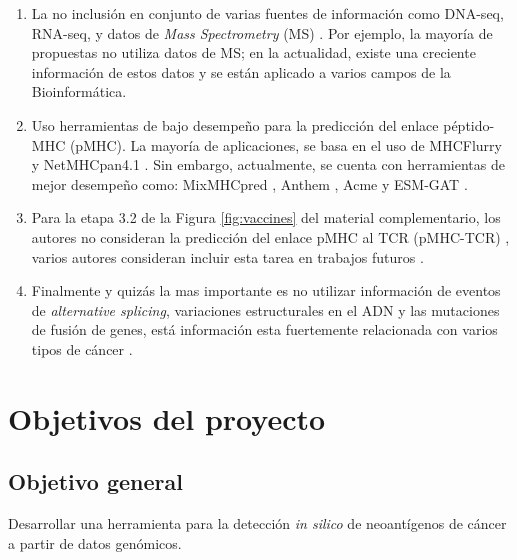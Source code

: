\documentclass[a4paper,11pt]{article}
\begin{document}
\begin{enumerate}
	\item La no inclusión en conjunto de varias fuentes de información como DNA-seq, RNA-seq, y datos de \textit{Mass Spectrometry} (MS) \cite{kim2018neopepsee}. Por ejemplo, la mayoría de  propuestas no utiliza datos de MS; en la actualidad, existe una creciente información de estos datos y se están aplicado a varios campos de la Bioinformática.
	
	\item  Uso herramientas de bajo desempeño para la predicción del enlace péptido-MHC (pMHC). La mayoría de aplicaciones, se basa en el uso de MHCFlurry \cite{o2020mhcflurry} y NetMHCpan4.1 \cite{reynisson2020netmhcpan}. Sin embargo, actualmente, se cuenta con herramientas de mejor desempeño como: MixMHCpred \cite{gfeller2023improved},  Anthem \cite{mei2021anthem}, Acme \cite{hu2019acme} y ESM-GAT \cite{hashemi2023improved}.
	
	\item Para la etapa 3.2 de la Figura \ref{fig:vaccines} del material complementario, los autores no consideran  la predicción del enlace pMHC al TCR (pMHC-TCR) , varios autores consideran incluir esta tarea en trabajos futuros  \cite{rubinsteyn2018computational}.
	
	\item Finalmente y quizás la mas importante es no utilizar información de eventos de \textit{alternative splicing}, variaciones estructurales en el ADN y las mutaciones de fusión de genes, está información esta fuertemente relacionada con varios tipos de cáncer \cite{wood2020neoepiscope}.
\end{enumerate}







	

	
\section{Objetivos del proyecto}
	
	\subsection{Objetivo general}
	
	Desarrollar una herramienta  para la detección \textit{in silico} de neoantígenos de cáncer a partir de datos genómicos.
	
\end{document}
